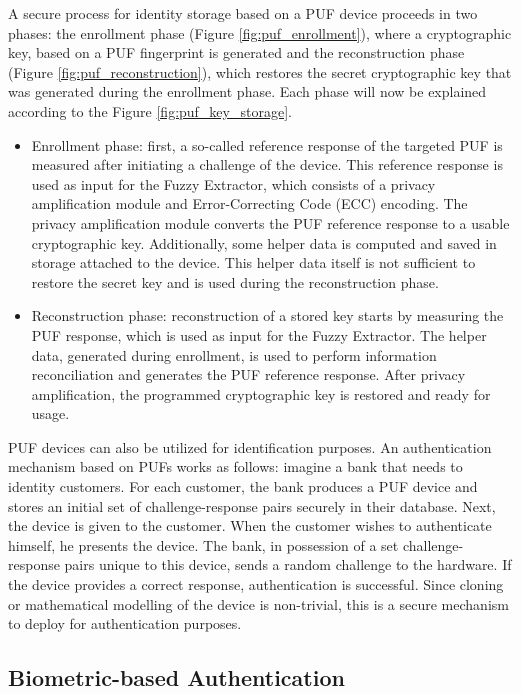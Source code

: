 \documentclass[USenglish]{article}
\begin{document}
A secure process for identity storage based on a PUF device proceeds in two phases: the enrollment phase (Figure \ref{fig:puf_enrollment}), where a cryptographic key, based on a PUF fingerprint is generated and the reconstruction phase (Figure \ref{fig:puf_reconstruction}), which restores the secret cryptographic key that was generated during the enrollment phase.
Each phase will now be explained according to the Figure \ref{fig:puf_key_storage}.
\begin{itemize}
	\item Enrollment phase: first, a so-called reference response of the targeted PUF is measured after initiating a challenge of the device. This reference response is used as input for the Fuzzy Extractor, which consists of a privacy amplification module and Error-Correcting Code (ECC) encoding. The privacy amplification module converts the PUF reference response to a usable cryptographic key. Additionally, some helper data is computed and saved in storage attached to the device. This helper data itself is not sufficient to restore the secret key and is used during the reconstruction phase.
	\item Reconstruction phase: reconstruction of a stored key starts by measuring the PUF response, which is used as input for the Fuzzy Extractor. The helper data, generated during enrollment, is used to perform information reconciliation and generates the PUF reference response. After privacy amplification, the programmed cryptographic key is restored and ready for usage.
\end{itemize}

PUF devices can also be utilized for identification purposes.
An authentication mechanism based on PUFs works as follows: imagine a bank that needs to identity customers.
For each customer, the bank produces a PUF device and stores an initial set of challenge-response pairs securely in their database.
Next, the device is given to the customer.
When the customer wishes to authenticate himself, he presents the device.
The bank, in possession of a set challenge-response pairs unique to this device, sends a random challenge to the hardware.
If the device provides a correct response, authentication is successful.
Since cloning or mathematical modelling of the device is non-trivial, this is a secure mechanism to deploy for authentication purposes.

\subsection{Biometric-based Authentication}
\end{document}
